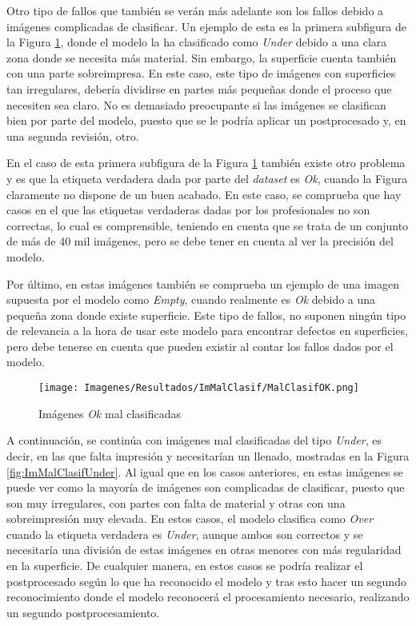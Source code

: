 \documentclass{report}
\begin{document}
Otro tipo de fallos que también se verán más adelante son los fallos debido a imágenes complicadas de clasificar. Un ejemplo de esta es la primera subfigura de la Figura \ref{fig:ImMalClasifOk}, donde el modelo la ha clasificado como \textit{Under} debido a una clara zona donde se necesita más material. Sin embargo, la superficie cuenta también con una parte sobreimpresa. En este caso, este tipo de imágenes con superficies tan irregulares, debería dividirse en partes más pequeñas donde el proceso que necesiten sea claro. No es demasiado preocupante si las imágenes se clasifican bien por parte del modelo, puesto que se le podría aplicar un postprocesado y, en una segunda revisión, otro. 

En el caso de esta primera subfigura de la Figura \ref{fig:ImMalClasifOk} también existe otro problema y es que la etiqueta verdadera dada por parte del \textit{dataset} es \textit{Ok}, cuando la Figura claramente no dispone de un buen acabado. En este caso, se comprueba que hay casos en el que las etiquetas verdaderas dadas por los profesionales no son correctas, lo cual es comprensible, teniendo en cuenta que se trata de un conjunto de más de 40 mil imágenes, pero se debe tener en cuenta al ver la precisión del modelo.


Por último, en estas imágenes también se comprueba un ejemplo de una imagen supuesta por el modelo como \textit{Empty}, cuando realmente es \textit{Ok} debido a una pequeña zona donde existe superficie. Este tipo de fallos, no suponen ningún tipo de relevancia a la hora de usar este modelo para encontrar defectos en superficies, pero debe tenerse en cuenta que pueden existir al contar los fallos dados por el modelo.


\begin{figure}[H]
    \centering
    \texttt{[image: Imagenes/Resultados/ImMalClasif/MalClasifOK.png]}
    \caption{ Imágenes \textit{Ok} mal clasificadas  }
    \label{fig:ImMalClasifOk}
\end{figure}



A continuación, se continúa con imágenes mal clasificadas del tipo \textit{Under}, es decir, en las que falta impresión y necesitarían un llenado, mostradas en la Figura \ref{fig:ImMalClasifUnder}. Al igual que en los casos anteriores, en estas imágenes se puede ver como la mayoría de imágenes son complicadas de clasificar, puesto que son muy irregulares, con partes con falta de material y otras con una sobreimpresión muy elevada. En estos casos, el modelo clasifica como \textit{Over} cuando la etiqueta verdadera es \textit{Under}, aunque ambos son correctos y se necesitaría una división de estas imágenes en otras menores con más regularidad en la superficie. De cualquier manera, en estos casos se podría realizar el postprocesado según lo que ha reconocido el modelo y tras esto hacer un segundo reconocimiento donde el modelo reconocerá el procesamiento necesario, realizando un segundo postprocesamiento.
\end{document}
